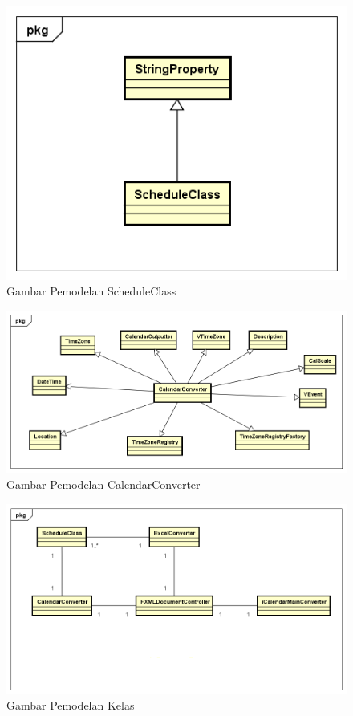 \begin{figure}[H]
	\centering
	\includegraphics[scale=0.5]{Gambar/pemodelanScheduleClass}
	\caption{Gambar Pemodelan ScheduleClass}
	\label{fig:pemodelanExcelConverter}
\end{figure}

\begin{figure}[H]
	\centering
	\includegraphics[scale=0.5]{Gambar/pemodelanCalendarConverter}
	\caption{Gambar Pemodelan CalendarConverter}
	\label{fig:pemodelanExcelConverter}
\end{figure}

\begin{figure}[H]
	\centering
	\includegraphics[scale=0.5]{Gambar/pemodelan-kelas}
	\caption{Gambar Pemodelan Kelas}
	\label{fig:pemodelanKelasSeluruh}
\end{figure}

